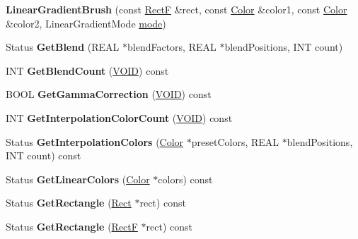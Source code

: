 \begin{DoxyCompactItemize}
{\bfseries Linear\+Gradient\+Brush} (const \hyperlink{struct_rect_f}{RectF} \&rect, const \hyperlink{struct_color}{Color} \&color1, const \hyperlink{struct_color}{Color} \&color2, Linear\+Gradient\+Mode \hyperlink{interfacevoid}{mode})
\item 
\mbox{\label{class_linear_gradient_brush_aded4fa77d8e47a54f1f0be68f7d2f40c}} 
Status {\bfseries Get\+Blend} (R\+E\+AL $\ast$blend\+Factors, R\+E\+AL $\ast$blend\+Positions, I\+NT count)
\item 
\mbox{\label{class_linear_gradient_brush_a17f91e222658ea1336b8976b17e100c0}} 
I\+NT {\bfseries Get\+Blend\+Count} (\hyperlink{interfacevoid}{V\+O\+ID}) const
\item 
\mbox{\label{class_linear_gradient_brush_ac6d722ef927082d22bef7c1a2e15577c}} 
B\+O\+OL {\bfseries Get\+Gamma\+Correction} (\hyperlink{interfacevoid}{V\+O\+ID}) const
\item 
\mbox{\label{class_linear_gradient_brush_a9c2a209cd6d57f67635917cf33a89a20}} 
I\+NT {\bfseries Get\+Interpolation\+Color\+Count} (\hyperlink{interfacevoid}{V\+O\+ID}) const
\item 
\mbox{\label{class_linear_gradient_brush_ac52c241defafb59408bb5576e788de57}} 
Status {\bfseries Get\+Interpolation\+Colors} (\hyperlink{struct_color}{Color} $\ast$preset\+Colors, R\+E\+AL $\ast$blend\+Positions, I\+NT count) const
\item 
\mbox{\label{class_linear_gradient_brush_aceac3eb1051aacb4a9ab0679e9c8c022}} 
Status {\bfseries Get\+Linear\+Colors} (\hyperlink{struct_color}{Color} $\ast$colors) const
\item 
\mbox{\label{class_linear_gradient_brush_a76402e2638611c3134f34e6bd5b1b27f}} 
Status {\bfseries Get\+Rectangle} (\hyperlink{struct_rect}{Rect} $\ast$rect) const
\item 
\mbox{\label{class_linear_gradient_brush_afdede92b2d58bb40d029b5b883d13f58}} 
Status {\bfseries Get\+Rectangle} (\hyperlink{struct_rect_f}{RectF} $\ast$rect) const

\end{DoxyCompactItemize}

